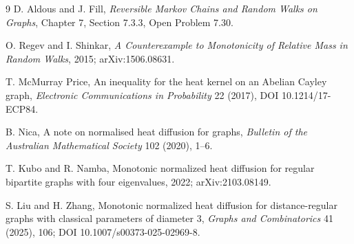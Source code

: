 \documentclass[11pt]{article}
\begin{document}
\begin{thebibliography}{9}
D. Aldous and J. Fill,
\emph{Reversible Markov Chains and Random Walks on Graphs},
Chapter 7, Section 7.3.3, Open Problem 7.30.

O. Regev and I. Shinkar,
\emph{A Counterexample to Monotonicity of Relative Mass in Random Walks},
2015; arXiv:1506.08631.

T. McMurray Price,
An inequality for the heat kernel on an Abelian Cayley graph,
\emph{Electronic Communications in Probability} 22 (2017), DOI 10.1214/17-ECP84.

B. Nica,
A note on normalised heat diffusion for graphs,
\emph{Bulletin of the Australian Mathematical Society} 102 (2020), 1--6.

T. Kubo and R. Namba,
Monotonic normalized heat diffusion for regular bipartite graphs with four eigenvalues,
2022; arXiv:2103.08149.

S. Liu and H. Zhang,
Monotonic normalized heat diffusion for distance-regular graphs with classical parameters of diameter $3$,
\emph{Graphs and Combinatorics} 41 (2025), 106; DOI 10.1007/s00373-025-02969-8.
\end{thebibliography}
\end{document}
